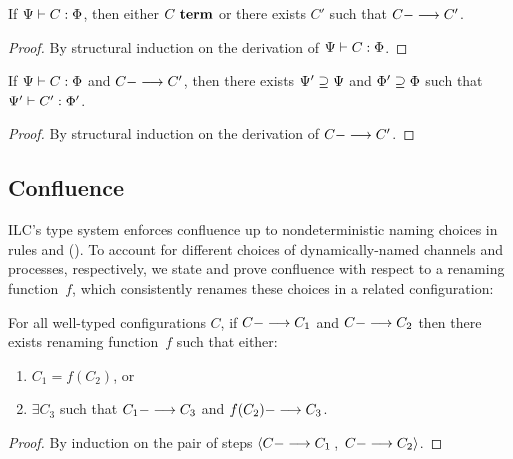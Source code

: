 

\begin{theorem}[Progress]
If $\JCty{\StTy}{\ChTy}{C}{\PrTy}$, then either $\JCterm{C}$ or there exists
$C'$ such that $\JCred{C}{C'}$.
\begin{proof}
    By structural induction on the derivation of
    $\JCty{\StTy}{\ChTy}{C}{\PrTy}$.
\end{proof}
\end{theorem}

\begin{theorem}[Preservation]
If $\JCty{\StTy}{\ChTy}{C}{\PrTy}$ and $\JCred{C}{C'}$, then there exists
$\ChTy' \supseteq \ChTy$ and $\PrTy' \supseteq \PrTy$ such that
$\JCty{\StTy'}{\ChTy'}{C'}{\PrTy'}$.
\begin{proof}
  By structural induction on the derivation of $\JCred{C}{C'}$.
\end{proof}
\end{theorem}

\subsection{Confluence}

ILC's type system enforces confluence 
up to nondeterministic naming choices in 
rules  and  ().
%
To account for different choices of dynamically-named channels and processes, respectively, 
we state and prove confluence
with respect to a renaming function~$f$, which consistently renames
these choices in a related configuration:

\begin{theorem}
For all well-typed configurations $C$,
%
 if $\JCred{C}{C_1}$ 
and $\JCred{C}{C_2}$ 
then 
there exists renaming function~$f$ 
such that either:
\begin{enumerate}
\item %
$C_1 = f(C_2)$,
or
\item $\exists C_3$ such that $\JCred{C_1}{C_3}$ and $\JCred{f(C_2)}{C_3}$.
\end{enumerate}
\begin{proof}
   By induction on the pair of steps 
   $\left< \JCred{C}{C_1}\right.$, 
   $\left.\JCred{C}{C_2} \right>$.
\end{proof}
\end{theorem}

